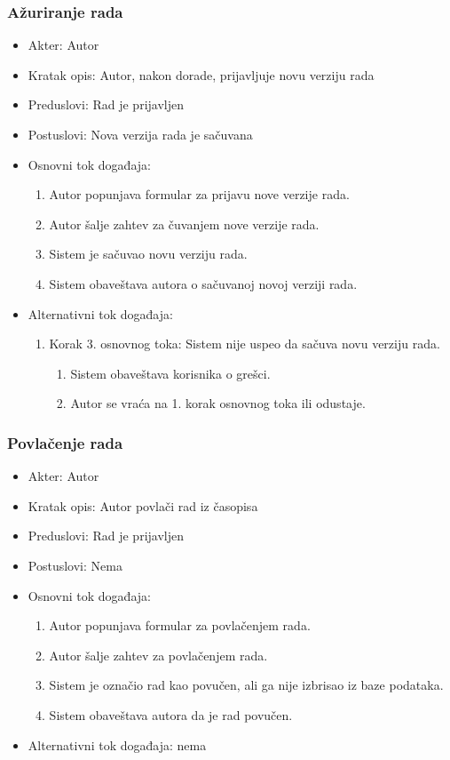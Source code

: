 \documentclass[a4paper]{article}
\begin{document}
\subsubsection{Ažuriranje rada}
\begin{itemize}
    \item Akter: Autor
    \item Kratak opis: Autor, nakon dorade, prijavljuje novu verziju rada
    \item Preduslovi: Rad je prijavljen
    \item Postuslovi: Nova verzija rada je sačuvana
    \item Osnovni tok događaja:
        \begin{enumerate}
           \item Autor popunjava formular za prijavu nove verzije rada.
           \item Autor šalje zahtev za čuvanjem nove verzije rada.
           \item Sistem je sačuvao novu verziju rada.
           \item Sistem obaveštava autora o sačuvanoj novoj verziji rada.
        \end{enumerate}
    \item Alternativni tok događaja:
        \begin{enumerate}
            \item Korak 3. osnovnog toka: Sistem nije uspeo da sačuva novu verziju rada.
            \begin{enumerate}
                \item Sistem obaveštava korisnika o grešci.
                \item Autor se vraća na 1. korak osnovnog toka ili odustaje.
            \end{enumerate}
        \end{enumerate}
\end{itemize}

\subsubsection{Povlačenje rada}
\begin{itemize}
    \item Akter: Autor
    \item Kratak opis: Autor povlači rad iz časopisa
    \item Preduslovi: Rad je prijavljen
    \item Postuslovi: Nema
    \item Osnovni tok događaja:
        \begin{enumerate}
           \item Autor popunjava formular za povlačenjem rada.
           \item Autor šalje zahtev za povlačenjem rada.
           \item Sistem je označio rad kao povučen, ali ga nije izbrisao iz baze podataka.
           \item Sistem obaveštava autora da je rad povučen.
        \end{enumerate}
    \item Alternativni tok događaja: nema
\end{itemize}
\end{document}
